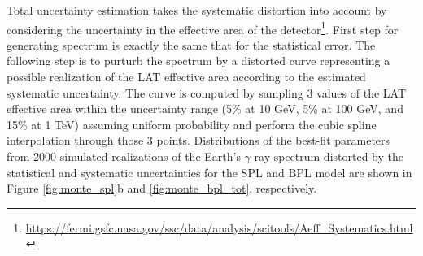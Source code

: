 Total uncertainty estimation takes the systematic distortion
into
account by considering the uncertainty in the effective area of
the detector\footnote{\url{https://fermi.gsfc.nasa.gov/ssc/data/analysis/scitools/Aeff_Systematics.html}}.
First step for generating spectrum is exactly the same that for the
statistical error. The following step is to purturb the spectrum by
a distorted curve representing a possible realization of
the LAT effective area according to the estimated systematic uncertainty.
The curve is computed by
sampling 3 values of the LAT effective area within
the uncertainty range (5\% at 10 GeV, 5\% at 100 GeV, and 15\% at 1 TeV)
assuming uniform probability and perform the cubic spline interpolation
through those 3 points. Distributions of the best-fit parameters
from 2000 simulated realizations of
the Earth's $\gamma$-ray spectrum distorted by the statistical
and systematic uncertainties for the SPL and BPL model are shown
in Figure \ref{fig:monte_spl}b and \ref{fig:monte_bpl_tot}, respectively. 



